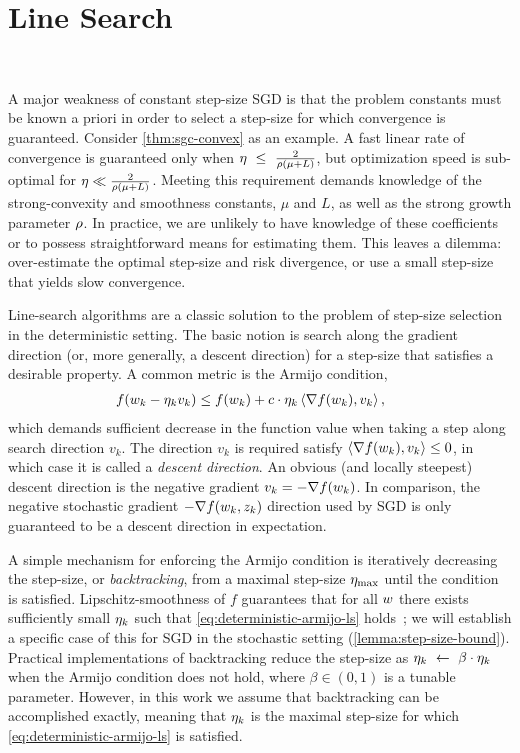 
\chapter{Line Search}~\label{ch:line-search}

A major weakness of constant step-size \ac{SGD} is that the problem constants must be known a priori in order to select a step-size for which convergence is guaranteed.
Consider \autoref{thm:sgc-convex} as an example. 
A fast linear rate of convergence is guaranteed only when \( \eta~\leq~\frac{2}{\rho\left(\mu + L\right)} \), but optimization speed is sub-optimal for \( \eta \ll \frac{2}{\rho\left(\mu + L\right)} \).
Meeting this requirement demands knowledge of the strong-convexity and smoothness constants, \( \mu \) and \( L \), as well as the strong growth parameter \( \rho \).
In practice, we are unlikely to have knowledge of these coefficients or to possess straightforward means for estimating them.
This leaves a dilemma: over-estimate the optimal step-size and risk divergence, or use a small step-size that yields slow convergence. 

Line-search algorithms are a classic solution to the problem of step-size selection in the deterministic setting.
The basic notion is search along the gradient direction (or, more generally, a descent direction) for a step-size that satisfies a desirable property.
A common metric is the Armijo condition, 
 \begin{align}
     f(w_k - \eta_k v_k) &\leq f(w_k) + c \cdot \eta_k \left\langle\nabla f(w_k), v_k\right\rangle,~\label{eq:deterministic-armijo-ls}
\end{align}
which demands sufficient decrease in the function value when taking a step along search direction \( v_k \).
The direction \( v_k \) is required satisfy \( \left\langle\nabla f(w_k), v_k\right\rangle \leq 0 \), in which case it is called a \emph{descent direction}.
An obvious (and locally steepest) descent direction is the negative gradient \( v_k = - \nabla f(w_k) \). 
In comparison, the negative stochastic gradient \( - \nabla f(w_k, z_{k}) \) direction used by \ac{SGD} is only guaranteed to be a descent direction in expectation.


A simple mechanism for enforcing the Armijo condition is iteratively decreasing the step-size, or \emph{backtracking}, from a maximal step-size \( \eta_{\text{max}} \) until the condition is satisfied.
Lipschitz-smoothness of \( f \) guarantees that for all \( w \) there exists sufficiently small \( \eta_k \) such that \autoref{eq:deterministic-armijo-ls} holds~\citep{nocedal1999numerical}; we will establish a specific case of this for \ac{SGD} in the stochastic setting (\autoref{lemma:step-size-bound}). 
Practical implementations of backtracking reduce the step-size as \( \eta_k~\gets~\beta \cdot \eta_k \) when the Armijo condition does not hold, where \( \beta \in (0,1) \) is a tunable parameter. 
However, in this work we assume that backtracking can be accomplished exactly, meaning that \( \eta_k \) is the maximal step-size for which \autoref{eq:deterministic-armijo-ls} is satisfied.

